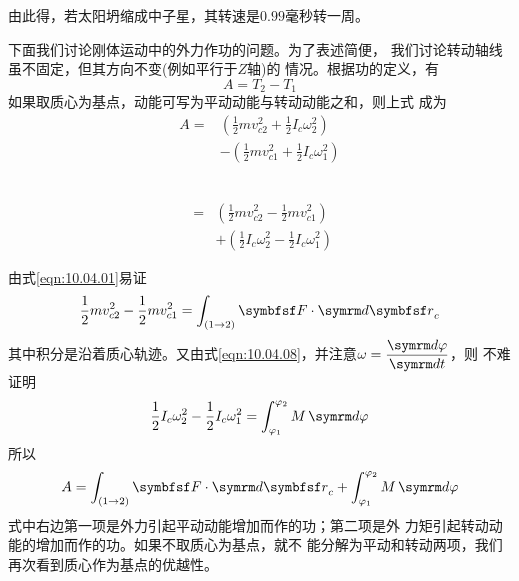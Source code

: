 由此得，若太阳坍缩成中子星，其转速是$ 0.99 $毫秒转一周。

下面我们讨论刚体运动中的外力作功的问题。为了表述简便，
我们讨论转动轴线虽不固定，但其方向不变(例如平行于$ Z $轴)的
情况。根据功的定义，有
\begin{equation*}
    A = T _ 2 - T _ 1
\end{equation*}
如果取质心为基点，动能可写为平动动能与转动动能之和，则上式
成为
\begin{equation*}
    \begin{split}
        A =& \left( \frac { 1 } { 2 } m v _ { c 2 } ^ { 2 } + \frac { 1 } { 2 } I _ { c } \omega _ 2 ^ { 2 } \right) \\
           &- \left( \frac { 1 } { 2 } m v _ { c 1 } ^ { 2 } + \frac { 1 } { 2 } I _ { c } \omega _ 1 ^ { 2 } \right)
    \end{split}
\end{equation*}

~\vspace{-2em}
\begin{equation*}
    \begin{split}
        ~~=& \left( \frac { 1 } { 2 } m v _ { c 2 } ^ { 2 } - \frac { 1 } { 2 } m v _ { c 1 } ^ { 2 } \right) \\
        &+ \left( \frac { 1 } { 2 } I _ { c } \omega _ 2 ^ { 2 } - \frac { 1 } { 2 } I _ { c } \omega _ 1 ^ { 2 } \right)
    \end{split}
\end{equation*}

由式\eqref{eqn:10.04.01}易证
\begin{equation*}
    \frac { 1 } { 2 } m v _ { c 2 } ^ { 2 } - \frac { 1 } { 2 } m v _ { c 1 } ^ { 2 } = \int _ { ( 1 \to 2 ) } \vec{F} \cdot  \dif \vec{r} _ { c }
\end{equation*}
其中积分是沿着质心轨迹。又由式\eqref{eqn:10.04.08}，并注意$ \omega = \dfrac {  \dif \varphi } {  \dif t } $，则
不难证明\vspace{-1.56em}
\begin{equation*}
    \frac { 1 } { 2 } I _ { c } \omega _ 2 ^ { 2 } - \frac { 1 } { 2 } I _ { c } \omega _ 1 ^ { 2 } = \int _ {\varphi_{ 1 }} ^ {\varphi_{ 2 }}  M  \dif \varphi
\end{equation*}
所以\vspace{-1.56em}
\begin{equation}\label{eqn:10.04.10}
    A = \int _ { ( 1 \to 2 ) } \vec{F} \cdot  \dif \vec{r} _ { c } + \int _ {\varphi_{ 1 }} ^ {\varphi_{ 2 }}  M  \dif \varphi
\end{equation}
式中右边第一项是外力引起平动动能增加而作的功；第二项是外
力矩引起转动动能的增加而作的功。如果不取质心为基点，就不
能分解为平动和转动两项，我们再次看到质心作为基点的优越性。

